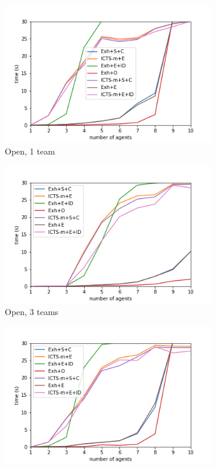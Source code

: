 \documentclass[english]{article}
\begin{document}
	\begin{figure}
		\centering
		\begin{subfigure}{0.49\textwidth}
			\centering
			\includegraphics[width=\linewidth]{img/results/open-1}
			\caption{Open, 1 team}
			\label{fig:open1}
		\end{subfigure}
		\begin{subfigure}{0.49\textwidth}
			\centering
			\includegraphics[width=\linewidth]{img/results/open-3}
			\caption{Open, 3 teams}
			\label{fig:open3}
		\end{subfigure}
		\begin{subfigure}{0.49\textwidth}
			\centering
			\includegraphics[width=\linewidth]{img/results/obstacle-1}

\end{subfigure}
\end{figure}
\end{document}
